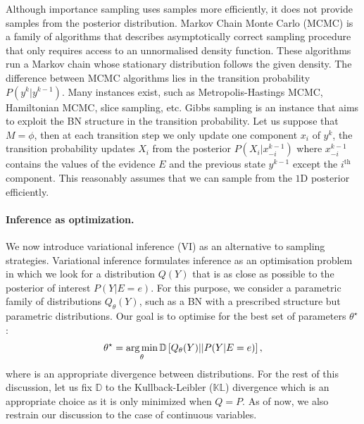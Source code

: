 Although importance sampling uses samples more efficiently, it does not provide samples from the posterior distribution. Markov Chain Monte Carlo (MCMC) is a family of algorithms that describes asymptotically correct sampling procedure that only requires access to an unnormalised density function. These algorithms run a Markov chain whose stationary distribution follows the given density. The difference between MCMC algorithms lies in the transition probability $P(y^k|y^{k-1})$. Many instances exist, such as Metropolis-Hastings MCMC, Hamiltonian MCMC, slice sampling, etc. Gibbs sampling is an instance that aims to exploit the BN structure in the transition probability. Let us suppose that $M = \phi$, then at each transition step we only update one component $x_i$ of $y^k$, the transition probability updates $X_i$ from the posterior $P(X_i|x_{-i}^{k-1})$ where $x_{-i}^{k-1}$ contains the values of the evidence $E$ and the previous state $y^{k-1}$ except the $i^{\text{th}}$ component. This reasonably assumes that we can sample from the $1$D posterior efficiently.


\paragraph{Inference as optimization.}
We now introduce variational inference (VI) as an alternative to sampling strategies. Variational inference formulates inference as an optimisation problem in which we look for a distribution $Q(Y)$ that is as close as possible to the posterior of interest $P(Y|E=e)$. For this purpose, we consider a parametric family of distributions $Q_\theta(Y)$, such as a BN with a prescribed structure but parametric distributions. Our goal is to optimise for the best set of parameters $\theta^\star$:
\begin{align}
  \theta^\star = \operatorname*{arg\,min}_\theta \mathbb{D}\left[Q_\theta(Y)||P(Y|E=e) \right], \label{eq:obj_VI}
\end{align}
where is an appropriate divergence between distributions. For the rest of this discussion, let us fix $\mathbb{D}$ to the Kullback-Leibler ($\mathbb{KL}$) divergence which is an appropriate choice as it is only minimized when $Q = P$. As of now, we also restrain our discussion to the case of continuous variables.

